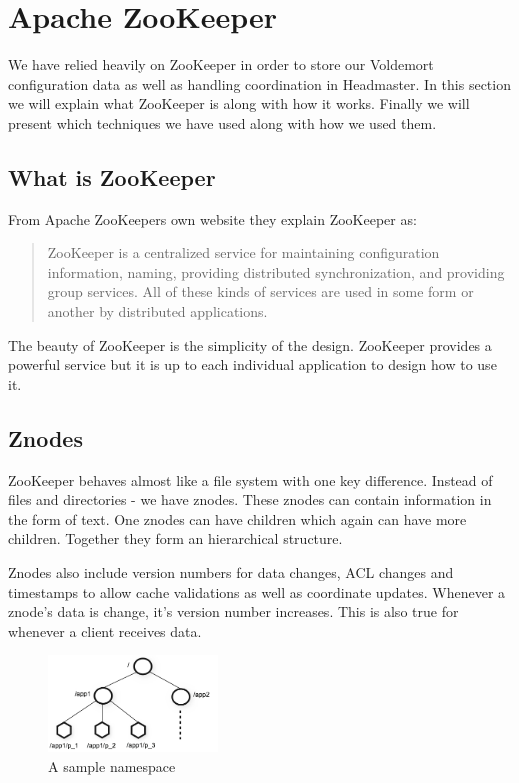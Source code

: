 \clearpage
\section{Apache ZooKeeper}
We have relied heavily on ZooKeeper in order to store our Voldemort configuration data as well as handling coordination in Headmaster. In this section we will explain what ZooKeeper is along with how it works. Finally we will present which techniques we have used along with how we used them. 

\subsection{What is ZooKeeper}
From Apache ZooKeepers own website\cite{zookeeper} they explain ZooKeeper as:

\blockquote{ZooKeeper is a centralized service for maintaining configuration information, naming, providing distributed synchronization, and providing group services. All of these kinds of services are used in some form or another by distributed applications.}

The beauty of ZooKeeper is the simplicity of the design. ZooKeeper provides a powerful service but it is up to each individual application to design how to use it. 


\subsection{Znodes}
ZooKeeper behaves almost like a file system with one key difference. Instead of files and directories - we have znodes. These znodes can contain information in the form of text. One znodes can have children which again can have more children. Together they form an hierarchical structure. 

Znodes also include version numbers for data changes, ACL changes and timestamps to allow cache validations as well as coordinate updates. Whenever a znode's data is change, it's version number increases. This is also true for whenever a client receives data. 

\begin{figure}[h]
    \centering
    \includegraphics[width=0.4\textwidth]{software/zknamespace.jpg}
    \caption{A sample namespace}
    \label{fig:zk_namespace}
\end{figure}

